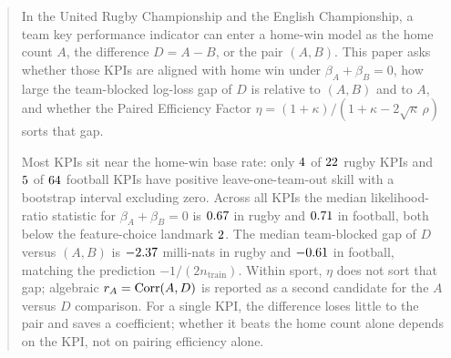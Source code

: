 \begin{abstract}
In the United Rugby Championship and the English Championship, a team key performance indicator can enter a home-win model as the home count $A$, the difference $D=A-B$, or the pair $(A,B)$.
This paper asks whether those KPIs are aligned with home win under $\beta_A+\beta_B=0$, how large the team-blocked log-loss gap of $D$ is relative to $(A,B)$ and to $A$, and whether the Paired Efficiency Factor $\eta=(1+\kappa)/(1+\kappa-2\sqrt{\kappa}\,\rho)$ sorts that gap.

Most KPIs sit near the home-win base rate: only $\PEFrugbyNinfo$ of $\PEFrugbyNkpis$ rugby KPIs and $\PEFfootNinfo$ of $\PEFfootNkpis$ football KPIs have positive leave-one-team-out skill with a bootstrap interval excluding zero.
Across all KPIs the median likelihood-ratio statistic for $\beta_A+\beta_B=0$ is $\PEFrugbyMedLR$ in rugby and $\PEFfootMedLR$ in football, both below the feature-choice landmark $\PEFLRaic$.
The median team-blocked gap of $D$ versus $(A,B)$ is $\PEFrugbyMedGapDf$ milli-nats in rugby and $\PEFfootMedGapDf$ in football, matching the prediction $-1/(2n_{\mathrm{train}})$.
Within sport, $\eta$ does not sort that gap; algebraic $r_A=\Corr(A,D)$ is reported as a second candidate for the $A$ versus $D$ comparison.
For a single KPI, the difference loses little to the pair and saves a coefficient; whether it beats the home count alone depends on the KPI, not on pairing efficiency alone.
\end{abstract}
